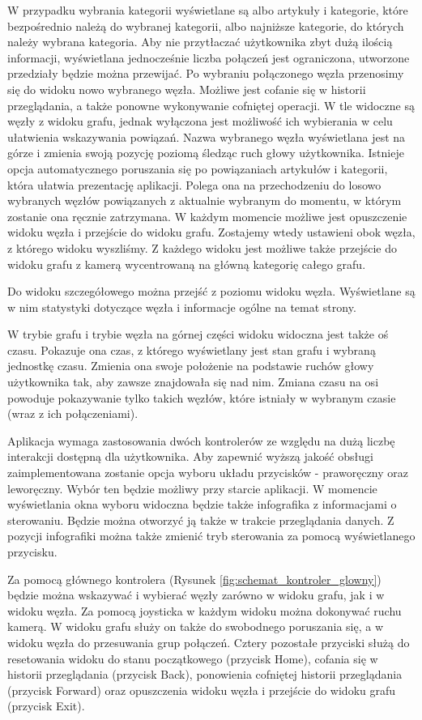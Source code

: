 W przypadku wybrania kategorii wyświetlane są albo artykuły i kategorie, które bezpośrednio należą do wybranej kategorii, albo najniższe kategorie, do których należy wybrana kategoria. Aby nie przytłaczać użytkownika zbyt dużą ilością informacji, wyświetlana jednocześnie liczba połączeń jest ograniczona, utworzone przedziały będzie można przewijać. Po wybraniu połączonego węzła przenosimy się do widoku nowo wybranego węzła. Możliwe jest cofanie się w historii przeglądania, a także ponowne wykonywanie cofniętej operacji. W tle widoczne są węzły z widoku grafu, jednak wyłączona jest możliwość ich wybierania w celu ułatwienia wskazywania powiązań. Nazwa wybranego węzła wyświetlana jest na górze i zmienia swoją pozycję poziomą śledząc ruch głowy użytkownika. Istnieje opcja automatycznego poruszania się po powiązaniach artykułów i kategorii, która ułatwia prezentację aplikacji. Polega ona na przechodzeniu do losowo wybranych węzłów powiązanych z aktualnie wybranym do momentu, w którym zostanie ona ręcznie zatrzymana. W każdym momencie możliwe jest opuszczenie widoku węzła i przejście do widoku grafu. Zostajemy wtedy ustawieni obok węzła, z którego widoku wyszliśmy. Z każdego widoku jest możliwe także przejście do widoku grafu z kamerą wycentrowaną na główną kategorię całego grafu.

Do widoku szczegółowego można przejść z poziomu widoku węzła. Wyświetlane są w nim statystyki dotyczące węzła i informacje ogólne na temat strony.

W trybie grafu i trybie węzła na górnej części widoku widoczna jest także oś czasu. Pokazuje ona czas, z którego wyświetlany jest stan grafu i wybraną jednostkę czasu. Zmienia ona swoje położenie na podstawie ruchów głowy użytkownika tak, aby zawsze znajdowała się nad nim. Zmiana czasu na osi powoduje pokazywanie tylko takich węzłów, które istniały w wybranym czasie (wraz z ich połączeniami).

Aplikacja wymaga zastosowania dwóch kontrolerów ze względu na dużą liczbę interakcji dostępną dla użytkownika. Aby zapewnić wyższą jakość obsługi zaimplementowana zostanie opcja wyboru układu przycisków - praworęczny oraz leworęczny. Wybór ten będzie możliwy przy starcie aplikacji. W momencie wyświetlania okna wyboru widoczna będzie także infografika z informacjami o sterowaniu. Będzie można  otworzyć ją także w trakcie przeglądania danych. Z pozycji infografiki można także zmienić tryb sterowania za pomocą wyświetlanego przycisku.

Za pomocą głównego kontrolera (Rysunek \ref{fig:schemat_kontroler_glowny}) będzie można wskazywać i wybierać węzły zarówno w widoku grafu, jak i w widoku węzła. Za pomocą joysticka w każdym widoku można dokonywać ruchu kamerą. W widoku grafu służy on także do swobodnego poruszania się, a w widoku węzła do przesuwania grup połączeń. Cztery pozostałe przyciski służą do resetowania widoku do stanu początkowego (przycisk Home), cofania się w historii przeglądania (przycisk Back), ponowienia cofniętej historii przeglądania (przycisk Forward) oraz opuszczenia widoku węzła i przejście do widoku grafu (przycisk Exit).

